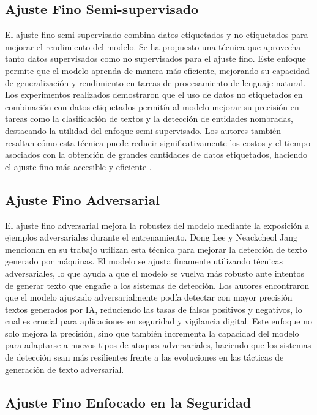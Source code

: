 \subsection{Ajuste Fino Semi-supervisado}

El ajuste fino semi-supervisado combina datos etiquetados y no etiquetados para mejorar el rendimiento del modelo. Se ha propuesto una técnica que aprovecha tanto datos supervisados como no supervisados para el ajuste fino. Este enfoque permite que el modelo aprenda de manera más eficiente, mejorando su capacidad de generalización y rendimiento en tareas de procesamiento de lenguaje natural. Los experimentos realizados demostraron que el uso de datos no etiquetados en combinación con datos etiquetados permitía al modelo mejorar su precisión en tareas como la clasificación de textos y la detección de entidades nombradas, destacando la utilidad del enfoque semi-supervisado. Los autores también resaltan cómo esta técnica puede reducir significativamente los costos y el tiempo asociados con la obtención de grandes cantidades de datos etiquetados, haciendo el ajuste fino más accesible y eficiente \cite{Su2021}.

\subsection{Ajuste Fino Adversarial}

El ajuste fino adversarial mejora la robustez del modelo mediante la exposición a ejemplos adversariales durante el entrenamiento. Dong Lee y Neackcheol Jang mencionan en su trabajo \cite{Lee2024} utilizan esta técnica para mejorar la detección de texto generado por máquinas. El modelo se ajusta finamente utilizando técnicas adversariales, lo que ayuda a que el modelo se vuelva más robusto ante intentos de generar texto que engañe a los sistemas de detección. Los autores encontraron que el modelo ajustado adversarialmente podía detectar con mayor precisión textos generados por IA, reduciendo las tasas de falsos positivos y negativos, lo cual es crucial para aplicaciones en seguridad y vigilancia digital. Este enfoque no solo mejora la precisión, sino que también incrementa la capacidad del modelo para adaptarse a nuevos tipos de ataques adversariales, haciendo que los sistemas de detección sean más resilientes frente a las evoluciones en las tácticas de generación de texto adversarial.

\subsection{Ajuste Fino Enfocado en la Seguridad}

